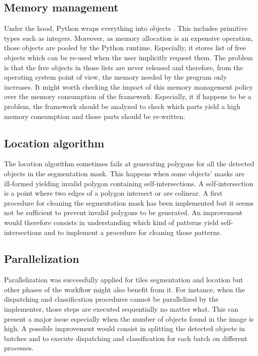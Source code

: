 \subsection{Memory management}
Under the hood, Python wraps everything into objects \cite{pythonleaks2016}. This includes primitive types such as integers. Moreover, as memory allocation is an expensive operation, those objects are pooled by the Python runtime. Especially, it stores list of free objects which can be re-used when the user implicitly request them. The problem is that the free objects in those lists are never released and therefore, from the operating system point of view, the memory needed by the program only increases. It might worth checking the impact of this memory management policy over the memory consumption of the framework. Especially, it if happens to be a problem, the framework should be analyzed to check which parts yield a high memory consumption and those parts should be re-written.

\subsection{Location algorithm}
The location algorithm sometimes fails at generating polygons for all the detected objects in the segmentation mask. This happens when some objects' masks are ill-formed yielding invalid polygon containing self-intersections. A self-intersection is a point where two edges of a polygon intersect or are colinear. A first procedure for cleaning the segmentation mask has been implemented but it seems not be sufficient to prevent invalid polygons to be generated. An improvement would therefore consists in understanding which kind of patterns yield self-intersections and to implement a procedure for cleaning those patterns. 

\subsection{Parallelization}
Parallelization was successfully applied for tiles segmentation and location but other phases of the workflow might also benefit from it. For instance, when the dispatching and classification procedures cannot be parallelized by the implementer, those steps are executed sequentially no matter what. This can present a major issue especially when the number of objects found in the image is high. A possible improvement would consist in splitting the detected objects in batches and to execute dispatching and classification for each batch on different processes. 

